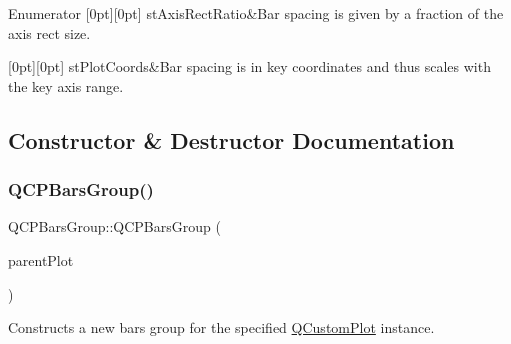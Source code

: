 \begin{DoxyEnumFields}{Enumerator}
[0pt][0pt]{}\mbox{\label{class_q_c_p_bars_group_a4c0521120a97e60bbca37677a37075b6a7b43366bb86f2ea96acb884f107c4728}} 
st\+Axis\+Rect\+Ratio&Bar spacing is given by a fraction of the axis rect size. \\
\hline

[0pt][0pt]{}\mbox{\label{class_q_c_p_bars_group_a4c0521120a97e60bbca37677a37075b6a73baa3f808dc74956073b8bb2eec391d}} 
st\+Plot\+Coords&Bar spacing is in key coordinates and thus scales with the key axis range. \\
\hline

\end{DoxyEnumFields}


\subsection{Constructor \& Destructor Documentation}
\mbox{\label{class_q_c_p_bars_group_aa4e043b9a22c6c5ea0f93740aca063e1}} 
\subsubsection{\texorpdfstring{Q\+C\+P\+Bars\+Group()}{QCPBarsGroup()}}
{\footnotesize\ttfamily Q\+C\+P\+Bars\+Group\+::\+Q\+C\+P\+Bars\+Group (\begin{DoxyParamCaption}\item[{\hyperlink{class_q_custom_plot}{Q\+Custom\+Plot} $\ast$}]{parent\+Plot }\end{DoxyParamCaption})}

Constructs a new bars group for the specified \hyperlink{class_q_custom_plot}{Q\+Custom\+Plot} instance. 

